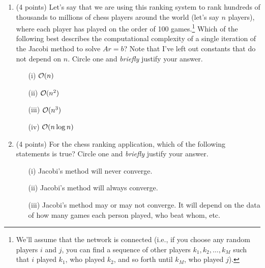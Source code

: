 \documentclass[12point]{article}
\begin{document}
\begin{enumerate}
\begin{enumerate}
\item (4 points) Let's say that we are using this ranking system to rank hundreds of thousands to millions of chess players around the world (let's say $n$ players), where each player has played on the order of 100 games.\footnote{We'll assume that the network is connected (i.e., if you choose any random players $i$ and $j$, you can find a sequence of other players $k_1, k_2,\ldots,k_M$ such that $i$ played $k_1$, who played $k_2$, and so forth until $k_M$, who played $j$).} Which of the following best describes the computational complexity of a single iteration of the Jacobi method to solve $Ar=b$? Note that I've left out constants that do not depend on $n$.  Circle one and \emph{briefly} justify your answer.
\begin{itemize}
\item[(i)] ${\cal O}(n)$
\item[(ii)] ${\cal O}(n^2)$
\item[(iii)] ${\cal O}(n^3)$
\item[(iv)] ${\cal O}(n \log n)$
\end{itemize}
\vspace{1.5in}

\item (4 points) For the chess ranking application, which of the following statements is true? Circle one and \emph{briefly} justify your answer. 
\begin{itemize}
\item[(i)] Jacobi's method will never converge.
\item[(ii)] Jacobi's method will always converge.
\item[(iii)] Jacobi's method may or may not converge. It will depend on the data of how many games each person played, who beat whom, etc.
\end{itemize}
\bigskip
\vspace{1.5in}

\end{enumerate}


\newpage



\end{enumerate}
\end{document}
